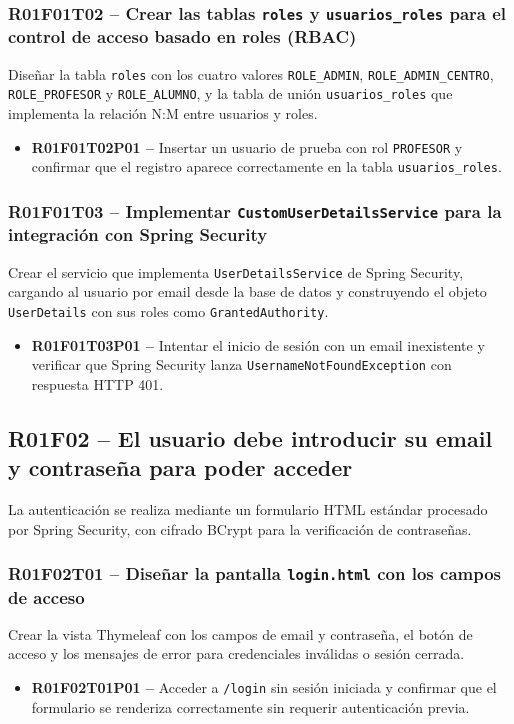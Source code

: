 \documentclass[12pt, a4paper]{report}
\begin{document}
\subsubsection{R01F01T02 -- Crear las tablas \texttt{roles} y \texttt{usuarios\_roles} para el control de acceso basado en roles (RBAC)}
Diseñar la tabla \texttt{roles} con los cuatro valores \texttt{ROLE\_ADMIN}, \texttt{ROLE\_ADMIN\_CENTRO}, \texttt{ROLE\_PROFESOR} y \texttt{ROLE\_ALUMNO}, y la tabla de unión \texttt{usuarios\_roles} que implementa la relación N:M entre usuarios y roles.
\begin{itemize}
  \item \textbf{R01F01T02P01 --} Insertar un usuario de prueba con rol \texttt{PROFESOR} y confirmar que el registro aparece correctamente en la tabla \texttt{usuarios\_roles}.
\end{itemize}

\subsubsection{R01F01T03 -- Implementar \texttt{CustomUserDetailsService} para la integración con Spring Security}
Crear el servicio que implementa \texttt{UserDetailsService} de Spring Security, cargando al usuario por email desde la base de datos y construyendo el objeto \texttt{UserDetails} con sus roles como \texttt{GrantedAuthority}.
\begin{itemize}
  \item \textbf{R01F01T03P01 --} Intentar el inicio de sesión con un email inexistente y verificar que Spring Security lanza \texttt{UsernameNotFoundException} con respuesta HTTP 401.
\end{itemize}

\subsection{R01F02 -- El usuario debe introducir su email y contraseña para poder acceder}

La autenticación se realiza mediante un formulario HTML estándar procesado por Spring Security, con cifrado BCrypt para la verificación de contraseñas.

\subsubsection{R01F02T01 -- Diseñar la pantalla \texttt{login.html} con los campos de acceso}
Crear la vista Thymeleaf con los campos de email y contraseña, el botón de acceso y los mensajes de error para credenciales inválidas o sesión cerrada.
\begin{itemize}
  \item \textbf{R01F02T01P01 --} Acceder a \texttt{/login} sin sesión iniciada y confirmar que el formulario se renderiza correctamente sin requerir autenticación previa.
\end{itemize}
\end{document}
